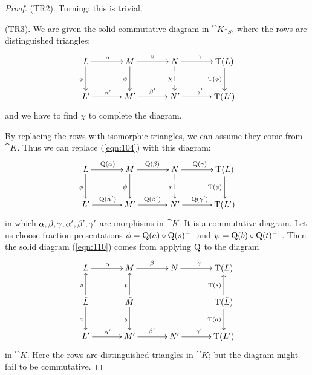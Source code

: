 \begin{proof}
\medskip \noindent 
(TR2). Turning: this is trivial. 

\medskip \noindent 
(TR3). We are given the solid commutative diagram in $\cat{K}_{\cat{S}}$,
where the rows are distinguished triangles:
\begin{equation} \label{eqn:104}
\UseTips \xymatrix @C=8ex @R=6ex { 
L 
\ar[r]^{\al}
\ar[d]_{\phi}
&
M
\ar[r]^{\be}
\ar[d]_{\psi}
& 
N
\ar[r]^{\ga}
\ar@{-->}[d]_{\chi}
&
\opn{T}(L)
\ar[d]_{\opn{T}(\phi)}
\\
L' 
\ar[r]^{\al'}
&
M'
\ar[r]^{\be'}
& 
N'
\ar[r]^{\ga'}
&
\opn{T}(L') 
} 
\end{equation}
and we have to find $\chi$ to complete the diagram. 

By replacing the rows with isomorphic triangles, we can assume they come from
$\cat{K}$.
Thus we can replace (\ref{eqn:104}) with this diagram:
\begin{equation} \label{eqn:110}
\UseTips \xymatrix @C=8ex @R=6ex { 
L 
\ar[r]^{\opn{Q}(\al)}
\ar[d]_{\phi}
&
M
\ar[r]^{\opn{Q}(\be)}
\ar[d]_{\psi}
& 
N
\ar[r]^{\opn{Q}(\ga)}
\ar@{-->}[d]_{\chi}
&
\opn{T}(L)
\ar[d]_{\opn{T}(\phi)}
\\
L' 
\ar[r]^{\opn{Q}(\al')}
&
M'
\ar[r]^{\opn{Q}(\be')}
& 
N'
\ar[r]^{\opn{Q}(\ga')}
&
\opn{T}(L') 
} 
\end{equation}
in which $\alpha, \beta, \gamma, \alpha', \beta', \gamma'$ are morphisms in $\cat{K}$. 
It is a commutative diagram. Let us choose fraction presentations 
$\phi = \operatorname{Q}(a) \circ \operatorname{Q}(s)^{-1}$ and $\psi = \operatorname{Q}(b) \circ 
\operatorname{Q}(t)^{-1}$. 
Then the solid diagram (\ref{eqn:110}) comes from applying $\operatorname{Q}$ to the 
diagram 
\begin{equation} \label{eqn:103}
\UseTips \xymatrix @C=8ex @R=5.5ex { 
L 
\ar[r]^{\al}
&
M
\ar[r]^{\be}
& 
N
\ar[r]^{\ga}
&
\opn{T}(L)
\\
\til{L} 
\ar[d]_{a}
\ar[u]^{s}
&
\til{M}
\ar[d]_{b}
\ar[u]^{t}
& 
&
\opn{T}(\til{L})
\ar[d]_{\opn{T}(a)}
\ar[u]^{\opn{T}(s)}
\\
L' 
\ar[r]^{\al'}
&
M'
\ar[r]^{\be'}
& 
N'
\ar[r]^{\ga'}
&
\opn{T}(L') 
} \end{equation}
in $\cat{K}$. Here the rows are distinguished triangles in $\cat{K}$; but the 
diagram might fail to be commutative. 


\end{proof}
